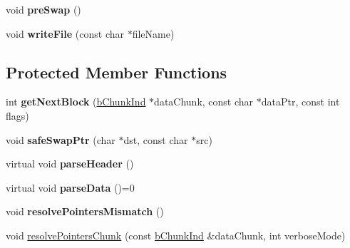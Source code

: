 \begin{DoxyCompactItemize}
\item 
\hypertarget{classb_parse_1_1b_file_af7e8447195328adad9482aea02a3f95a}{void {\bfseries pre\+Swap} ()}\label{classb_parse_1_1b_file_af7e8447195328adad9482aea02a3f95a}

\item 
\hypertarget{classb_parse_1_1b_file_a2c447377e525ed6a88bcf0433a64b07c}{void {\bfseries write\+File} (const char $\ast$file\+Name)}\label{classb_parse_1_1b_file_a2c447377e525ed6a88bcf0433a64b07c}

\end{DoxyCompactItemize}
\subsection*{Protected Member Functions}
\begin{DoxyCompactItemize}
\item 
\hypertarget{classb_parse_1_1b_file_a89c668acca880b07a5ca643e2b1c4651}{int {\bfseries get\+Next\+Block} (\hyperlink{classb_parse_1_1b_chunk_ind}{b\+Chunk\+Ind} $\ast$data\+Chunk, const char $\ast$data\+Ptr, const int flags)}\label{classb_parse_1_1b_file_a89c668acca880b07a5ca643e2b1c4651}

\item 
\hypertarget{classb_parse_1_1b_file_aae6245678a0e8bb644dd1ee57465c399}{void {\bfseries safe\+Swap\+Ptr} (char $\ast$dst, const char $\ast$src)}\label{classb_parse_1_1b_file_aae6245678a0e8bb644dd1ee57465c399}

\item 
\hypertarget{classb_parse_1_1b_file_a432a53521c83bfacc237a804baa2fdf8}{virtual void {\bfseries parse\+Header} ()}\label{classb_parse_1_1b_file_a432a53521c83bfacc237a804baa2fdf8}

\item 
\hypertarget{classb_parse_1_1b_file_a2e56087659bf18797b2be3faa497269f}{virtual void {\bfseries parse\+Data} ()=0}\label{classb_parse_1_1b_file_a2e56087659bf18797b2be3faa497269f}

\item 
\hypertarget{classb_parse_1_1b_file_ad0b066dbb1432fadc409459f1bf9b704}{void {\bfseries resolve\+Pointers\+Mismatch} ()}\label{classb_parse_1_1b_file_ad0b066dbb1432fadc409459f1bf9b704}

\item 
\hypertarget{classb_parse_1_1b_file_a29fd1be50eeeed19ca8ce9c54a8211d3}{void \hyperlink{classb_parse_1_1b_file_a29fd1be50eeeed19ca8ce9c54a8211d3}{resolve\+Pointers\+Chunk} (const \hyperlink{classb_parse_1_1b_chunk_ind}{b\+Chunk\+Ind} \&data\+Chunk, int verbose\+Mode)}\label{classb_parse_1_1b_file_a29fd1be50eeeed19ca8ce9c54a8211d3}


\end{DoxyCompactItemize}
